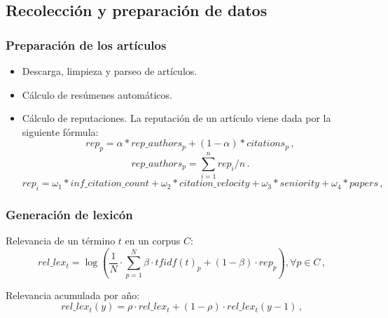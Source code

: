 \documentclass[10pt,fleqn]{beamer}
\begin{document}
\subsection{Recolección y preparación de datos}
\begin{frame} \frametitle{Preparación de los artículos} 
\begin{itemize}
\item Descarga, limpieza y parseo de artículos.
\item Cálculo de resúmenes automáticos.
\item Cálculo de reputaciones.
La reputación de un artículo viene dada por la siguiente fórmula:
\begin{equation}
	rep_{p} = \alpha * 	rep\_authors_{p}  + (1 - \alpha) * citations_{p} \,,
\end{equation}
\begin{equation}\label{eq:1}
	rep\_authors_{p} = \sum  \limits_{i=1}^n  rep_{i} / n \,.
\end{equation}
\begin{equation}
	rep_{i}=\omega_1 * inf\_citation\_count + \omega_2 * citation\_velocity+\omega_3 * seniority + \omega_4 * papers \,,
    \label{eq:author_reputation}
\end{equation}


\end{itemize}

\end{frame}

\begin{frame} \frametitle{Generación de lexicón} 

Relevancia de un término $t$ en un corpus $C$:
\begin{equation}
	rel\_lex_{t} =\log\left(\frac{1}{N} \cdot \sum \limits_{p=1}^N \beta  \cdot tfidf(t)_p + (1-\beta) \cdot rep_p\right), \forall p \in C \,,
\label{eq:4}
\end{equation}

Relevancia acumulada por año:
\begin{equation}
	rel\_lex_{t}(y) = \rho \cdot rel\_lex_{t} + (1-\rho)\cdot rel\_lex_{t}(y-1) \,,
\label{eq:5}
\end{equation}

\end{frame}
\end{document}
